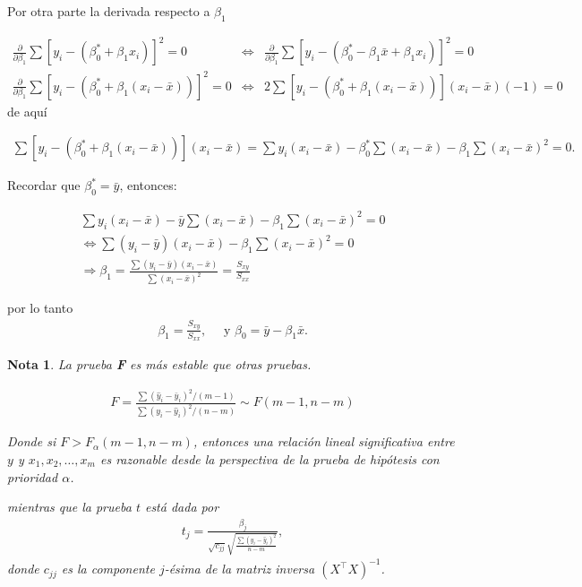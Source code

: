 \documentclass[12pt]{article}
\newtheorem{Note}{Nota}%
\begin{document}
Por otra parte la derivada respecto a $\beta_1$

\begin{eqnarray*}
\frac{\partial}{\partial \beta_1} \sum \left[ y_i - \left( \beta_0^* + \beta_1 x_i \right) \right]^2 = 0
&\Leftrightarrow&\frac{\partial}{\partial \beta_1} \sum \left[ y_i - \left( \beta_0^* - \beta_1 \bar{x} + \beta_1 x_i \right) \right]^2 = 0\\
\frac{\partial}{\partial \beta_1} \sum \left[ y_i - \left( \beta_0^* + \beta_1 (x_i - \bar{x}) \right) \right]^2 = 0&\Leftrightarrow&
2 \sum \left[ y_i - \left( \beta_0^* + \beta_1 (x_i - \bar{x}) \right) \right](x_i - \bar{x}) (-1) = 0
\end{eqnarray*}
de aqu\'i

\begin{eqnarray*}
\sum \left[ y_i - \left( \beta_0^* + \beta_1 (x_i - \bar{x}) \right) \right](x_i - \bar{x})=\sum y_i (x_i - \bar{x}) - \beta_0^* \sum (x_i - \bar{x}) - \beta_1 \sum (x_i - \bar{x})^2 = 0.
\end{eqnarray*}

Recordar que $\beta_0^* = \bar{y}$, entonces:

\begin{eqnarray*}
\sum y_i (x_i - \bar{x}) - \bar{y} \sum (x_i - \bar{x}) - \beta_1 \sum (x_i - \bar{x})^2 = 0\\
\Leftrightarrow \sum (y_i - \bar{y})(x_i - \bar{x}) - \beta_1 \sum (x_i - \bar{x})^2 = 0\\
\Rightarrow \beta_1 = \frac{\sum (y_i - \bar{y})(x_i - \bar{x})}{\sum (x_i - \bar{x})^2} = \frac{S_{xy}}{S_{xx}}
\end{eqnarray*}

por lo tanto
\begin{eqnarray*}
\boxed{ \beta_1 = \frac{S_{xy}}{S_{xx}}, } \quad \textrm{ y }\boxed{ \beta_0 = \bar{y} - \beta_1 \bar{x}.}
\end{eqnarray*}


\begin{Note}

La prueba \textbf{F} es más estable que otras pruebas.

\begin{eqnarray}
F = \frac{\sum (\hat{y}_i - \bar{y}_i)^2 / (m - 1)}{\sum (y_i - \hat{y}_i)^2 / (n - m)} \sim F(m - 1, n - m)
\end{eqnarray}

Donde si $F > F_\alpha(m - 1, n - m)$, entonces una relación lineal significativa entre $y$ y $x_1, x_2, \dots, x_m$ es razonable desde la perspectiva de la prueba de hipótesis con prioridad $ \alpha$.

mientras que la prueba $t$ est\'a dada por
\begin{eqnarray}
t_j = \frac{\beta_j}{\sqrt{c_{jj}} \sqrt{ \frac{\sum (y_i - \hat{y}_i)^2}{n - m} }},
\end{eqnarray}
donde \( c_{jj} \) es la componente \( j \)-ésima de la matriz inversa \( (X^\top X)^{-1} \).
\end{Note}
\end{document}
